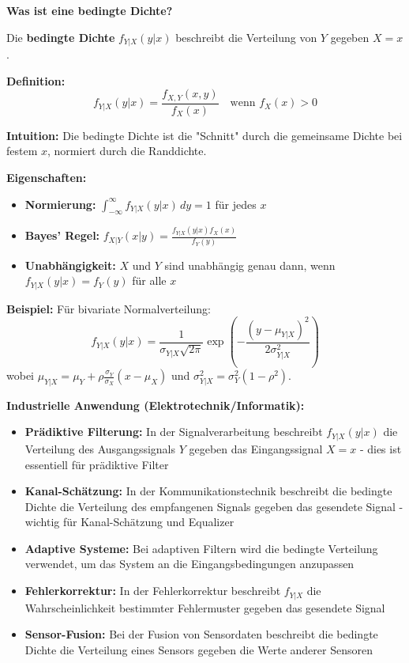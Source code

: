 \begin{denoobification}
\textbf{Was ist eine bedingte Dichte?}

Die \textbf{bedingte Dichte} $f_{Y|X}(y|x)$ beschreibt die Verteilung von $Y$ gegeben $X = x$.

\textbf{Definition:}
\[
f_{Y|X}(y|x) = \frac{f_{X,Y}(x,y)}{f_X(x)} \quad \text{wenn } f_X(x) > 0
\]

\textbf{Intuition:} Die bedingte Dichte ist die "Schnitt" durch die gemeinsame Dichte bei festem $x$, normiert durch die Randdichte.

\textbf{Eigenschaften:}
\begin{itemize}
    \item \textbf{Normierung:} $\int_{-\infty}^{\infty} f_{Y|X}(y|x) \, dy = 1$ für jedes $x$
    \item \textbf{Bayes' Regel:} $f_{X|Y}(x|y) = \frac{f_{Y|X}(y|x) f_X(x)}{f_Y(y)}$
    \item \textbf{Unabhängigkeit:} $X$ und $Y$ sind unabhängig genau dann, wenn $f_{Y|X}(y|x) = f_Y(y)$ für alle $x$
\end{itemize}

\textbf{Beispiel:} Für bivariate Normalverteilung:
\[
f_{Y|X}(y|x) = \frac{1}{\sigma_{Y|X}\sqrt{2\pi}} \exp\left(-\frac{(y - \mu_{Y|X})^2}{2\sigma_{Y|X}^2}\right)
\]
wobei $\mu_{Y|X} = \mu_Y + \rho \frac{\sigma_Y}{\sigma_X}(x - \mu_X)$ und $\sigma_{Y|X}^2 = \sigma_Y^2(1-\rho^2)$.

\textbf{Industrielle Anwendung (Elektrotechnik/Informatik):}
\begin{itemize}
    \item \textbf{Prädiktive Filterung:} In der Signalverarbeitung beschreibt $f_{Y|X}(y|x)$ die Verteilung des Ausgangssignals $Y$ gegeben das Eingangssignal $X = x$ - dies ist essentiell für prädiktive Filter
    \item \textbf{Kanal-Schätzung:} In der Kommunikationstechnik beschreibt die bedingte Dichte die Verteilung des empfangenen Signals gegeben das gesendete Signal - wichtig für Kanal-Schätzung und Equalizer
    \item \textbf{Adaptive Systeme:} Bei adaptiven Filtern wird die bedingte Verteilung verwendet, um das System an die Eingangsbedingungen anzupassen
    \item \textbf{Fehlerkorrektur:} In der Fehlerkorrektur beschreibt $f_{Y|X}$ die Wahrscheinlichkeit bestimmter Fehlermuster gegeben das gesendete Signal
    \item \textbf{Sensor-Fusion:} Bei der Fusion von Sensordaten beschreibt die bedingte Dichte die Verteilung eines Sensors gegeben die Werte anderer Sensoren
\end{itemize}


\end{denoobification}
